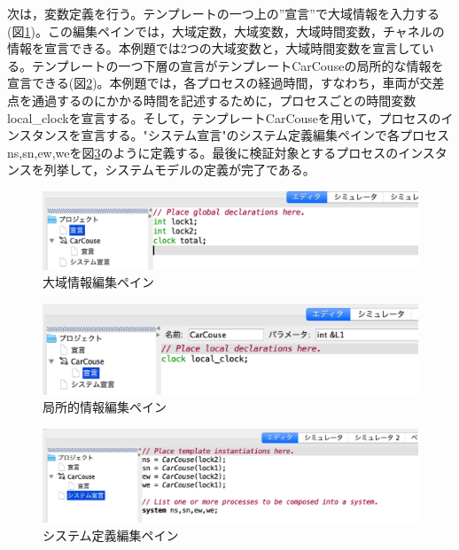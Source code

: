 \documentclass{tpu-sotu}
\begin{document}
	次は，変数定義を行う。テンプレートの一つ上の”宣言”で大域情報を入力する(図\ref{GD})。この編集ペインでは，大域定数，大域変数，大域時間変数，チャネルの情報を宣言できる。本例題では2つの大域変数と，大域時間変数を宣言している。テンプレートの一つ下層の宣言がテンプレートCarCouseの局所的な情報を宣言できる(図\ref{LD})。本例題では，各プロセスの経過時間，すなわち，車両が交差点を通過するのにかかる時間を記述するために，プロセスごとの時間変数local\_clockを宣言する。そして，テンプレートCarCouseを用いて，プロセスのインスタンスを宣言する。"システム宣言"のシステム定義編集ペインで各プロセスns,sn,ew,weを図\ref{SysD}のように定義する。最後に検証対象とするプロセスのインスタンスを列挙して，システムモデルの定義が完了である。
	\begin{figure}[htbp]
	\centering
	\includegraphics[width=140mm]{GlobalDec.png}
	\caption{大域情報編集ペイン}
	\label{GD}
	\end{figure}
	\begin{figure}[htbp]
	\centering
	\includegraphics[width=140mm]{LocalDec.png}
	\caption{局所的情報編集ペイン}
	\label{LD}
	\end{figure}
	\begin{figure}[htbp]
	\centering
	\includegraphics[width=140mm]{SystemDec.png}
	\caption{システム定義編集ペイン}
	\label{SysD}
	\end{figure}
	
\end{document}
